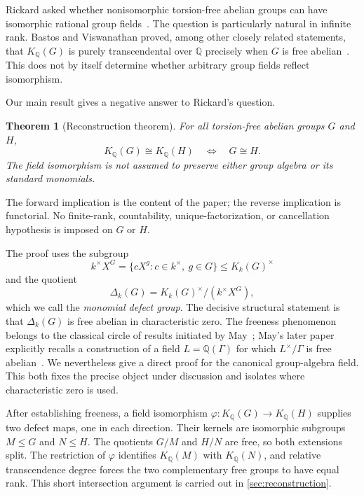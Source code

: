\documentclass[11pt,a4paper]{article}
\numberwithin{equation}{section}
\theoremstyle{plain}
\newtheorem{theorem}{Theorem}[section]
\theoremstyle{definition}
\theoremstyle{remark}
\newcommand{\Q}{\mathbb Q}
\newcommand{\Kk}[1]{K_k(#1)}
\newcommand{\KQ}[1]{K_{\Q}(#1)}
\newcommand{\Dk}[1]{\Delta_k(#1)}
\newcommand{\mon}[1]{X^{#1}}
\begin{document}
Rickard asked whether nonisomorphic torsion-free abelian groups can have
isomorphic rational group fields~\cite{RickardMO2017}.  The question is
particularly natural in infinite rank.  Bastos and Viswanathan proved, among
other closely related statements, that $\KQ G$ is purely transcendental over
$\Q$ precisely when $G$ is free abelian~\cite{BastosViswanathan1988}.  This
does not by itself determine whether arbitrary group fields reflect
isomorphism.

Our main result gives a negative answer to Rickard's question.

\begin{theorem}[Reconstruction theorem]\label{thm:intro-main}
For all torsion-free abelian groups $G$ and $H$,
\[
  \KQ G\cong\KQ H
  \quad\Longleftrightarrow\quad
  G\cong H.
\]
The field isomorphism is not assumed to preserve either group algebra or its
standard monomials.
\end{theorem}

The forward implication is the content of the paper; the reverse implication
is functorial.  No finite-rank, countability, unique-factorization, or
cancellation hypothesis is imposed on $G$ or $H$.

The proof uses the subgroup
\[
  k^\times X^G=\{c\mon g:c\in k^\times,\ g\in G\}
  \leq \Kk G^\times
\]
and the quotient
\begin{equation}\label{eq:defect-intro}
  \Dk G=\Kk G^\times/(k^\times X^G),
\end{equation}
which we call the \emph{monomial defect group}.  The decisive structural
statement is that $\Dk G$ is free abelian in characteristic zero.  The
freeness phenomenon belongs to the classical circle of results initiated by
May~\cite{May1972}; May's later paper explicitly recalls a construction of a
field $L=\Q(\Gamma)$ for which $L^\times/\Gamma$ is free
abelian~\cite[proof of Theorem~1]{May1979}.  We nevertheless give a direct
proof for the canonical group-algebra field.  This both fixes the precise
object under discussion and isolates where characteristic zero is used.

After establishing freeness, a field isomorphism
$\varphi:\KQ G\to\KQ H$ supplies two defect maps, one in each direction.
Their kernels are isomorphic subgroups $M\leq G$ and $N\leq H$.  The
quotients $G/M$ and $H/N$ are free, so both extensions split.  The restriction
of $\varphi$ identifies $\KQ M$ with $\KQ N$, and relative transcendence
degree forces the two complementary free groups to have equal rank.  This
short intersection argument is carried out in \cref{sec:reconstruction}.
\end{document}

